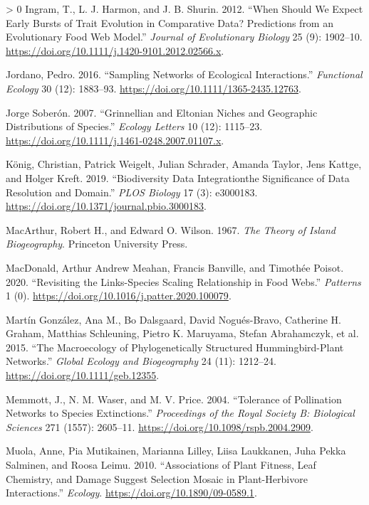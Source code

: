 \documentclass[11pt]{article}
\newlength{\cslhangindent}
\newenvironment{CSLReferences}[3] %
 {%
  \setlength{\parindent}{0pt}
  \ifodd #1 \everypar{\setlength{\hangindent}{\cslhangindent}}\ignorespaces\fi
  \ifnum #2 > 0
  \setlength{\parskip}{#2\baselineskip}
  \fi
 }%
 {}
\begin{document}
\begin{CSLReferences}{1}{0}
\leavevmode\hypertarget{ref-Ingram2012WheSho}{}%
Ingram, T., L. J. Harmon, and J. B. Shurin. 2012. {``When Should We
Expect Early Bursts of Trait Evolution in Comparative Data? Predictions
from an Evolutionary Food Web Model.''} \emph{Journal of Evolutionary
Biology} 25 (9): 1902--10.
\url{https://doi.org/10.1111/j.1420-9101.2012.02566.x}.

\leavevmode\hypertarget{ref-Jordano2016SamNet}{}%
Jordano, Pedro. 2016. {``Sampling Networks of Ecological
Interactions.''} \emph{Functional Ecology} 30 (12): 1883--93.
\url{https://doi.org/10.1111/1365-2435.12763}.

\leavevmode\hypertarget{ref-JorgeSoberon2007GriElt}{}%
Jorge Soberón. 2007. {``Grinnellian and Eltonian Niches and Geographic
Distributions of Species.''} \emph{Ecology Letters} 10 (12): 1115--23.
\url{https://doi.org/10.1111/j.1461-0248.2007.01107.x}.

\leavevmode\hypertarget{ref-Konig2019BioDat}{}%
König, Christian, Patrick Weigelt, Julian Schrader, Amanda Taylor, Jens
Kattge, and Holger Kreft. 2019. {``Biodiversity Data Integrationthe
Significance of Data Resolution and Domain.''} \emph{PLOS Biology} 17
(3): e3000183. \url{https://doi.org/10.1371/journal.pbio.3000183}.

\leavevmode\hypertarget{ref-MacArthur1967TheIsl}{}%
MacArthur, Robert H., and Edward O. Wilson. 1967. \emph{The Theory of
Island Biogeography}. Princeton University Press.

\leavevmode\hypertarget{ref-MacDonald2020RevLin}{}%
MacDonald, Arthur Andrew Meahan, Francis Banville, and Timothée Poisot.
2020. {``Revisiting the Links-Species Scaling Relationship in Food
Webs.''} \emph{Patterns} 1 (0).
\url{https://doi.org/10.1016/j.patter.2020.100079}.

\leavevmode\hypertarget{ref-MartinGonzalez2015MacPhy}{}%
Martín González, Ana M., Bo Dalsgaard, David Nogués-Bravo, Catherine H.
Graham, Matthias Schleuning, Pietro K. Maruyama, Stefan Abrahamczyk, et
al. 2015. {``The Macroecology of Phylogenetically Structured
Hummingbird-Plant Networks.''} \emph{Global Ecology and Biogeography} 24
(11): 1212--24. \url{https://doi.org/10.1111/geb.12355}.

\leavevmode\hypertarget{ref-Memmott2004TolPol}{}%
Memmott, J., N. M. Waser, and M. V. Price. 2004. {``Tolerance of
Pollination Networks to Species Extinctions.''} \emph{Proceedings of the
Royal Society B: Biological Sciences} 271 (1557): 2605--11.
\url{https://doi.org/10.1098/rspb.2004.2909}.

\leavevmode\hypertarget{ref-Muola2010AssPla}{}%
Muola, Anne, Pia Mutikainen, Marianna Lilley, Liisa Laukkanen, Juha
Pekka Salminen, and Roosa Leimu. 2010. {``Associations of Plant Fitness,
Leaf Chemistry, and Damage Suggest Selection Mosaic in Plant-Herbivore
Interactions.''} \emph{Ecology}.
\url{https://doi.org/10.1890/09-0589.1}.


\end{CSLReferences}
\end{document}
